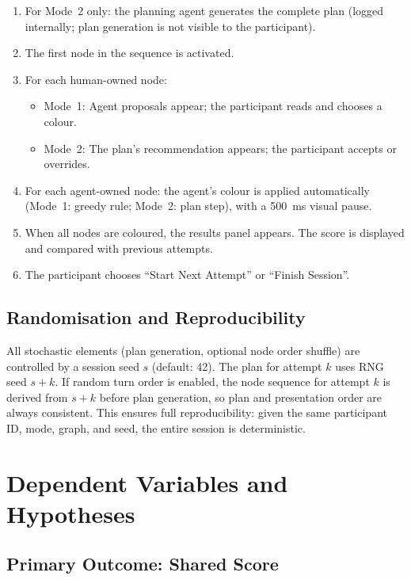 \documentclass[11pt]{article}
\theoremstyle{definition}
\begin{document}
\begin{enumerate}[nosep]
  \item For Mode~2 only: the planning agent generates the complete plan (logged
    internally; plan generation is not visible to the participant).
  \item The first node in the sequence is activated.
  \item For each human-owned node:
    \begin{itemize}[nosep]
      \item Mode~1: Agent proposals appear; the participant reads and chooses a colour.
      \item Mode~2: The plan's recommendation appears; the participant accepts or overrides.
    \end{itemize}
  \item For each agent-owned node: the agent's colour is applied automatically (Mode~1:
    greedy rule; Mode~2: plan step), with a 500~ms visual pause.
  \item When all nodes are coloured, the results panel appears.  The score is displayed
    and compared with previous attempts.
  \item The participant chooses ``Start Next Attempt'' or ``Finish Session''.
\end{enumerate}

\subsection{Randomisation and Reproducibility}

All stochastic elements (plan generation, optional node order shuffle) are controlled by
a session seed $s$ (default: 42).  The plan for attempt $k$ uses RNG seed $s + k$.
If random turn order is enabled, the node sequence for attempt $k$ is derived from
$s + k$ before plan generation, so plan and presentation order are always consistent.
This ensures full reproducibility: given the same participant ID, mode, graph, and seed,
the entire session is deterministic.

\section{Dependent Variables and Hypotheses}
\label{sec:measures}

\subsection{Primary Outcome: Shared Score}
\end{document}
